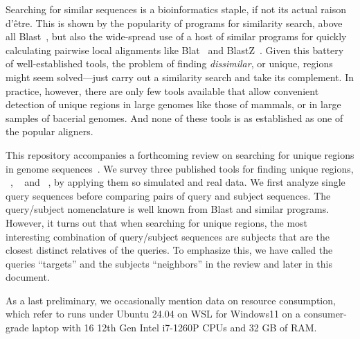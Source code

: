 Searching for similar sequences is a bioinformatics staple, if not its
actual raison d'\^etre. This is shown by the popularity of programs
for similarity search, above all Blast~\cite{alt90:bas,alt97:gap}, but
also the wide-spread use of a host of similar programs for quickly
calculating pairwise local alignments like Blat~\cite{ken02:bla} and
BlastZ~\cite{sch03:hum}. Given this battery of well-established tools,
the problem of finding \emph{dissimilar}, or unique, regions might
seem solved---just carry out a similarity search and take its
complement. In practice, however, there are only few tools available
that allow convenient detection of unique regions in large genomes
like those of mammals, or in large samples of bacerial genomes. And
none of these tools is as established as one of the popular aligners.

This repository accompanies a forthcoming review on searching for
unique regions in genome sequences~\cite{vie25:fas}. We survey three
published tools for finding unique
regions, ~\cite{poc20:gen}, ~\cite{pir19:hig}
and ~\cite{hau21:fur,vie24:mar}, by applying them so simulated
and real data. We first analyze single query sequences before
comparing pairs of query and subject sequences. The query/subject
nomenclature is well known from Blast and similar programs. However,
it turns out that when searching for unique regions, the most
interesting combination of query/subject sequences are subjects that
are the closest distinct relatives of the queries. To emphasize this,
we have called the queries ``targets'' and the subjects ``neighbors''
in the review and later in this document.

As a last preliminary, we occasionally mention data on resource
consumption, which refer to runs under Ubuntu 24.04 on WSL for
Windows11 on a consumer-grade laptop with 16 12th Gen Intel i7-1260P
CPUs and 32 GB of RAM.
